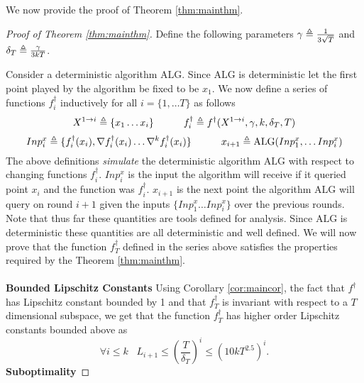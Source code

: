 \documentclass[final,12pt]{colt2018} %
\def\hardf{f^{\dagger}}
\def\alg{\mathrm{ALG}}
\begin{document}
We now provide the proof of Theorem \ref{thm:mainthm}.
\begin{proof}[Proof of Theorem \ref{thm:mainthm}]

Define the following parameters $\gamma \triangleq \frac{1}{3\sqrt{T}}$ and $\delta_T \triangleq \frac{\gamma}{3kT}$.

Consider a deterministic algorithm $\alg$. Since $\alg$ is deterministic let the first point played by the algorithm be fixed to be $x_1$. We now define a series of functions $\hardf_i$ inductively for all $i = \{1, \ldots T\}$ as follows
\begin{equation}
  \label{eqn:Xdefn}
  X^{1 \rightarrow i} \defeq \{x_1 \ldots x_i\} \quad\quad\quad \hardf_i \defeq \hardf(X^{1 \rightarrow i}, \gamma, k, \delta_T, T)
\end{equation}
\begin{equation}
  \label{eqn:inductinpidefn}
  Inp^x_i \defeq \{ \hardf_i(x_i), \nabla \hardf_i(x_i) \ldots \nabla^k \hardf_i(x_i)\} \quad\quad\quad x_{i+1} \defeq \alg(Inp^x_1, \ldots Inp^x_i)
\end{equation}
The above definitions \textit{simulate} the deterministic algorithm $\alg$ with respect to changing functions $\hardf_i$. $Inp_{i}^x$ is the input the algorithm will receive if it queried point $x_i$ and the function was $\hardf_i$. $x_{i+1}$ is the next point the algorithm $\alg$ will query on round $i+1$ given the inputs $\{Inp_1^x \ldots Inp_i^x\}$ over the previous rounds. Note that thus far these quantities are tools defined for analysis. Since $\alg$ is deterministic these quantities are all deterministic and well defined. We will now prove that the function $\hardf_T$ defined in the series above satisfies the properties required by the Theorem \ref{thm:mainthm}. 
\\
\\
\noindent \textbf{Bounded Lipschitz Constants} Using Corollary \ref{cor:maincor}, the fact that $\hardf$ has Lipschitz constant bounded by 1 and that $\hardf_T$ is invariant with respect to a $T$ dimensional subspace, we get that the function $\hardf_T$ has higher order Lipschitz constants bounded above as
\[ \forall i \leq k \;\;\; L_{i+1} \leq \left(\frac{T}{\delta_T}\right)^i \leq \left(10kT^{2.5}\right)^i.\] 
\noindent \textbf{Suboptimality}


\end{proof}
\end{document}
